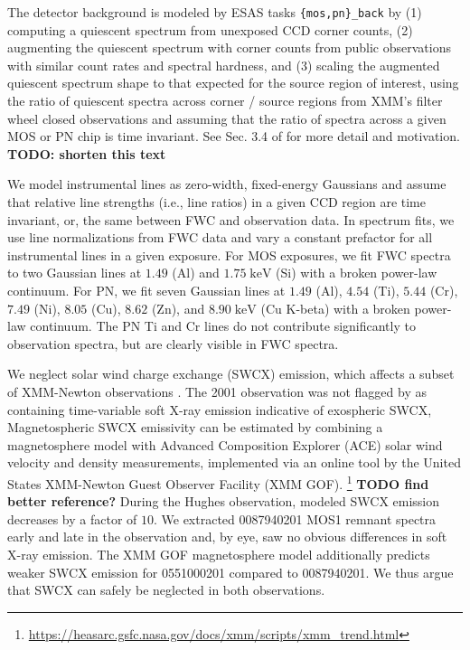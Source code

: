 \documentclass[preprint2,tighten,trackchanges]{aastex6}
\newcommand*{\mt}{\mathrm}
\newcommand*{\unit}[1]{\;\mt{#1}}  %
\begin{document}
The detector background is modeled by ESAS tasks \texttt{\{mos,pn\}\_back}
by (1) computing a quiescent spectrum from unexposed CCD corner counts,
(2) augmenting the quiescent spectrum with corner counts from public
observations with similar count rates and spectral hardness, and (3) scaling
the augmented quiescent spectrum shape to that expected for the source region
of interest, using the ratio of quiescent spectra across corner / source
regions from XMM's filter wheel closed observations and assuming that the ratio
of spectra across a given MOS or PN chip is time invariant.
See Sec. 3.4 of \citet{kuntz2008} for more detail and motivation.
\textbf{TODO: shorten this text}

We model instrumental lines as zero-width, fixed-energy Gaussians and assume
that relative line strengths (i.e., line ratios) in a given CCD region are time
invariant, or, the same between FWC and observation data.
In spectrum fits, we use line normalizations from FWC data and vary a constant
prefactor for all instrumental lines in a given exposure.
For MOS exposures, we fit FWC spectra to two Gaussian lines at $1.49$ (Al) and
$1.75 \unit{keV}$ (Si) with a broken power-law continuum.
For PN, we fit seven Gaussian lines at $1.49$ (Al), $4.54$ (Ti), $5.44$ (Cr),
$7.49$ (Ni), $8.05$ (Cu), $8.62$ (Zn), and $8.90 \unit{keV}$ (Cu K-beta) with a
broken power-law continuum.
The PN Ti and Cr lines do not contribute significantly to observation spectra,
but are clearly visible in FWC spectra.

We neglect solar wind charge exchange (SWCX) emission, which affects a subset
of XMM-Newton observations \citep{snowden2004}.
The 2001 observation was not flagged by \citet{carter2011} as
containing time-variable soft X-ray emission indicative of exospheric SWCX,
Magnetospheric SWCX emissivity can be estimated by combining a magnetosphere
model \citep{spreiter1966} with Advanced Composition Explorer (ACE) solar wind
velocity and density measurements, implemented via an online tool by the United
States XMM-Newton Guest Observer Facility (XMM GOF).
\footnote{\href{https://heasarc.gsfc.nasa.gov/docs/xmm/scripts/xmm_trend.html}{https://heasarc.gsfc.nasa.gov/docs/xmm/scripts/xmm\_trend.html}}
\textbf{TODO find better reference?}  %
During the Hughes observation, modeled SWCX emission decreases by a
factor of $10$.
We extracted 0087940201 MOS1 remnant spectra early and late in the observation
and, by eye, saw no obvious differences in soft X-ray emission.
The XMM GOF magnetosphere model additionally predicts weaker SWCX emission for
0551000201 compared to 0087940201.
We thus argue that SWCX can safely be neglected in both observations.
\end{document}
